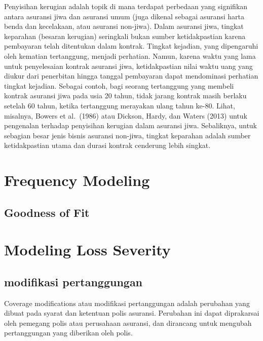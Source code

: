 \documentclass[
]{book}
\begin{document}
Penyisihan kerugian adalah topik di mana terdapat perbedaan yang signifikan antara asuransi jiwa dan asuransi umum (juga dikenal sebagai asuransi harta benda dan kecelakaan, atau asuransi non-jiwa). Dalam asuransi jiwa, tingkat keparahan (besaran kerugian) seringkali bukan sumber ketidakpastian karena pembayaran telah ditentukan dalam kontrak. Tingkat kejadian, yang dipengaruhi oleh kematian tertanggung, menjadi perhatian. Namun, karena waktu yang lama untuk penyelesaian kontrak asuransi jiwa, ketidakpastian nilai waktu uang yang diukur dari penerbitan hingga tanggal pembayaran dapat mendominasi perhatian tingkat kejadian. Sebagai contoh, bagi seorang tertanggung yang membeli kontrak asuransi jiwa pada usia 20 tahun, tidak jarang kontrak masih berlaku setelah 60 tahun, ketika tertanggung merayakan ulang tahun ke-80. Lihat, misalnya, Bowers et al.~(1986) atau Dickson, Hardy, dan Waters (2013) untuk pengenalan terhadap penyisihan kerugian dalam asuransi jiwa. Sebaliknya, untuk sebagian besar jenis bisnis asuransi non-jiwa, tingkat keparahan adalah sumber ketidakpastian utama dan durasi kontrak cenderung lebih singkat.

\hypertarget{frequency-modeling}{%
\chapter{Frequency Modeling}\label{frequency-modeling}}

\hypertarget{goodness-of-fit}{%
\section{Goodness of Fit}\label{goodness-of-fit}}

\hypertarget{modeling-loss-severity}{%
\chapter{Modeling Loss Severity}\label{modeling-loss-severity}}

\hypertarget{modifikasi-pertanggungan}{%
\section{modifikasi pertanggungan}\label{modifikasi-pertanggungan}}

Coverage modifications atau modifikasi pertanggungan adalah perubahan yang dibuat pada syarat dan ketentuan polis asuransi. Perubahan ini dapat diprakarsai oleh pemegang polis atau perusahaan asuransi, dan dirancang untuk mengubah pertanggungan yang diberikan oleh polis.
\end{document}
